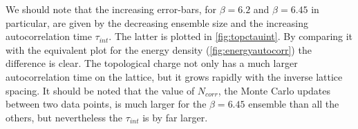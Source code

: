 We should note that the increasing error-bars, for $\beta = 6.2$ and $\beta = 6.45$ in particular, are given by the decreasing ensemble size and the increasing autocorrelation time $\tau_{int}$. The latter  is plotted in \cref{fig:topctauint}. By comparing it with the equivalent plot for the energy density (\cref{fig:energyautocorr}) the difference is clear. The topological charge not only has a much larger autocorrelation time on the lattice, but it grows rapidly with the inverse lattice spacing. It should be noted that the value of $N_{corr}$, the Monte Carlo updates between two data points, is much larger for the $\beta=6.45$ ensemble than all the others, but nevertheless the $\tau_{int}$ is by far larger.

